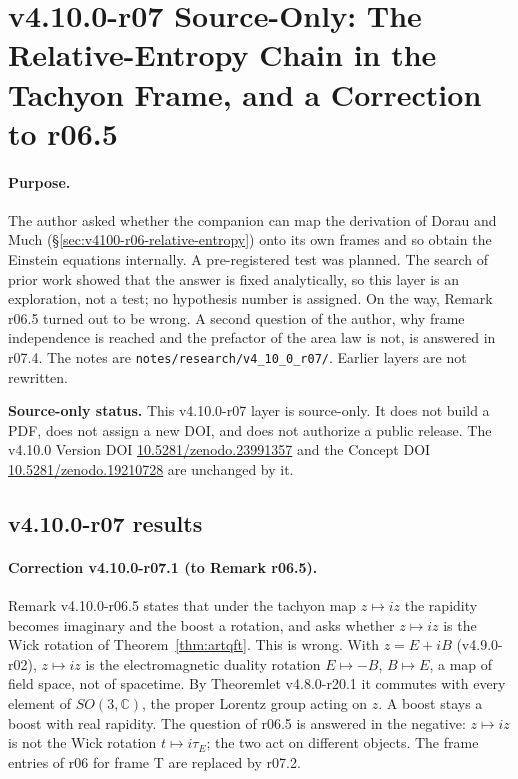 \clearpage
\section*{v4.10.0-r07 Source-Only: The Relative-Entropy Chain in the Tachyon Frame, and a Correction to r06.5}
\label{sec:v4100-r07-tachyon-chain}

\paragraph{Purpose.}
The author asked whether the companion can map the derivation of Dorau and Much (\S\ref{sec:v4100-r06-relative-entropy}) onto its own frames and
so obtain the Einstein equations internally.  A pre-registered test was planned.  The search of prior work showed that the answer is fixed
analytically, so this layer is an exploration, not a test; no hypothesis number is assigned.  On the way, Remark r06.5 turned out to be wrong.  A second question of the author, why frame independence is reached and the prefactor of the area law is not, is answered in r07.4.
The notes are \texttt{notes/\allowbreak research/\allowbreak v4\_10\_0\_r07/}.  Earlier layers are not rewritten.

\noindent\textbf{Source-only status.}
This v4.10.0-r07 layer is source-only.  It does not build a PDF, does not assign a new DOI,
and does not authorize a public release.  The v4.10.0 Version DOI
\href{https://doi.org/10.5281/zenodo.23991357}{10.5281/zenodo.23991357} and the Concept DOI
\href{https://doi.org/10.5281/zenodo.19210728}{10.5281/zenodo.19210728} are unchanged by it.

\subsection*{v4.10.0-r07 results}
\label{subsec:v4100-r07-results}

\paragraph{Correction v4.10.0-r07.1 (to Remark r06.5).}
Remark v4.10.0-r06.5 states that under the tachyon map \(z\mapsto iz\) the rapidity becomes imaginary and the boost a rotation, and asks whether
\(z\mapsto iz\) is the Wick rotation of Theorem~\ref{thm:artqft}.  This is wrong.  With \(z=E+iB\) (v4.9.0-r02), \(z\mapsto iz\) is the
electromagnetic duality rotation \(E\mapsto-B\), \(B\mapsto E\), a map of field space, not of spacetime.  By Theoremlet v4.8.0-r20.1 it commutes with
every element of \(SO(3,\mathbb C)\), the proper Lorentz group acting on \(z\).  A boost stays a boost with real rapidity.  The question of r06.5 is
answered in the negative: \(z\mapsto iz\) is not the Wick rotation \(t\mapsto i\tau_E\); the two act on different objects.  The frame entries of r06 for
frame T are replaced by r07.2.

